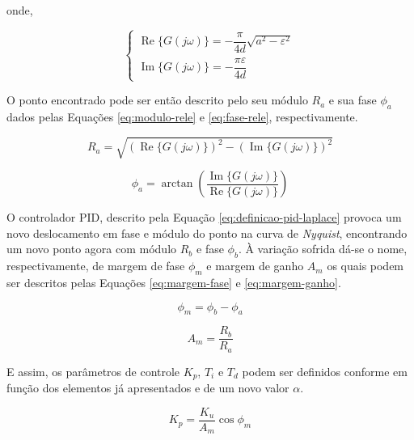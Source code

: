 			\noindent
			onde, 

			\begin{equation*}
				\begin{cases}
					\operatorname{Re}\{G(j \omega)\} = -\dfrac{\pi}{4d} \sqrt{a^2 - \varepsilon^2} \\[10pt]
					\operatorname{Im}\{G(j \omega)\} = -\dfrac{\pi \varepsilon}{4d}
				\end{cases}
			\end{equation*}

			O ponto encontrado pode ser então descrito pelo seu módulo $R_a$ e sua fase $\phi_a$ dados pelas Equações \ref{eq:modulo-rele} e \ref{eq:fase-rele}, respectivamente.

			\begin{equation}
				\label{eq:modulo-rele}
				R_a = \sqrt{(\operatorname{Re}\{G(j \omega)\})^2 - (\operatorname{Im}\{G(j \omega)\})^2}
			\end{equation}

			\begin{equation}
				\label{eq:fase-rele}
				\phi_a = \arctan \left( \frac{\operatorname{Im}\{G(j \omega)\}}{\operatorname{Re}\{G(j \omega)\}} \right)
			\end{equation}

			O controlador \gls{PID}, descrito pela Equação \ref{eq:definicao-pid-laplace} provoca um novo deslocamento em fase e módulo do ponto na curva de \textit{Nyquist}, encontrando um novo ponto agora com módulo $R_b$ e fase $\phi_b$. À variação sofrida dá-se o nome, respectivamente, de margem de fase $\phi_m$ e margem de ganho $A_m$ os quais podem ser descritos pelas Equações \ref{eq:margem-fase} e \ref{eq:margem-ganho}.

			\begin{equation}
				\label{eq:margem-fase}
				\phi_m = \phi_b - \phi_a
			\end{equation}

			\begin{equation}
				\label{eq:margem-ganho}
				A_m = \frac{R_b}{R_a}
			\end{equation}

			E assim, os parâmetros de controle $K_p$, $T_i$ e $T_d$ podem ser definidos conforme  em função dos elementos já apresentados e de um novo valor $\alpha$.

			\begin{equation}
				\label{eq:parametro-kp}
				K_p = \frac{K_u}{A_m} \cos \phi_m
			\end{equation}


